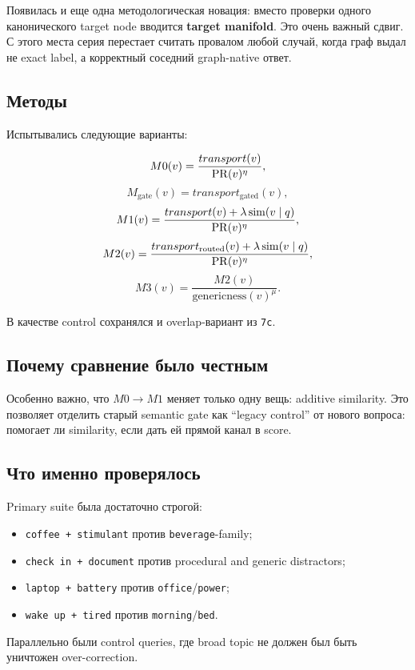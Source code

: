 Появилась и еще одна методологическая новация: вместо проверки одного
канонического target node вводится \textbf{target manifold}. Это очень важный
сдвиг. С этого места серия перестает считать провалом любой случай, когда граф
выдал не exact label, а корректный соседний graph-native ответ.

\subsection{Методы}

Испытывались следующие варианты:

\[
M0(v)=\frac{transport(v)}{\mathrm{PR}(v)^\eta},
\]
\[
M_{\mathrm{gate}}(v)=transport_{\mathrm{gated}}(v),
\]
\[
M1(v)=\frac{transport(v)+\lambda\,\mathrm{sim}(v\mid q)}{\mathrm{PR}(v)^\eta},
\]
\[
M2(v)=\frac{transport_{\mathrm{routed}}(v)+\lambda\,\mathrm{sim}(v\mid q)}{\mathrm{PR}(v)^\eta},
\]
\[
M3(v)=\frac{M2(v)}{\text{genericness}(v)^\mu}.
\]

В качестве control сохранялся и overlap-вариант из \texttt{7c}.

\subsection{Почему сравнение было честным}

Особенно важно, что \(M0 \to M1\) меняет только одну вещь: additive similarity.
Это позволяет отделить старый semantic gate как ``legacy control'' от нового
вопроса: помогает ли similarity, если дать ей прямой канал в score.

\subsection{Что именно проверялось}

Primary suite была достаточно строгой:

\begin{itemize}[leftmargin=2em]
\item \texttt{coffee + stimulant} против \texttt{beverage}-family;
\item \texttt{check in + document} против procedural and generic distractors;
\item \texttt{laptop + battery} против \texttt{office}/\texttt{power};
\item \texttt{wake up + tired} против \texttt{morning}/\texttt{bed}.
\end{itemize}

Параллельно были control queries, где broad topic не должен был быть уничтожен
over-correction.

